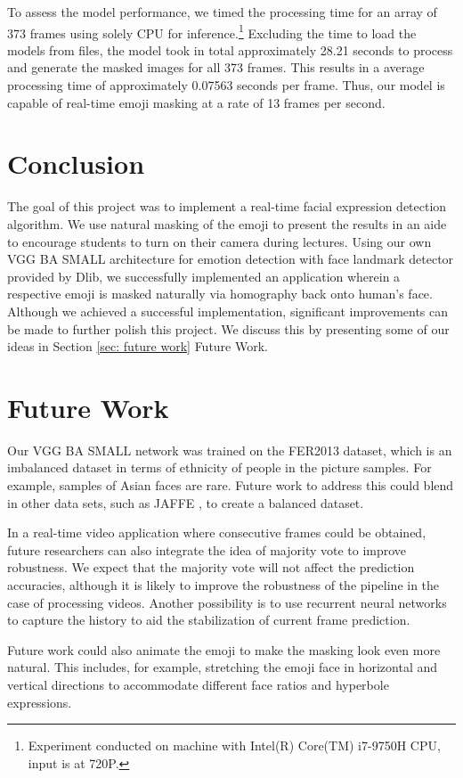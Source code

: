 \documentclass{article}
\begin{document}
To assess the model performance, we timed the processing time for an array of 373 frames using solely CPU for inference.\footnote{Experiment conducted on machine with Intel(R) Core(TM) i7-9750H CPU, input is at 720P.} Excluding the time to load the models from files, the model took in total approximately 28.21 seconds to process and generate the masked images for all 373 frames. This results in a average processing time of approximately 0.07563 seconds per frame. Thus, our model is capable of real-time emoji masking at a rate of 13 frames per second. 
\section{Conclusion}
The goal of this project was to implement a real-time facial expression detection algorithm. We use natural masking of the emoji to present the results in an aide to encourage students to turn on their camera during lectures. Using our own VGG BA SMALL architecture for emotion detection with face landmark detector provided by Dlib, we successfully implemented an application wherein a respective emoji is masked naturally via homography back onto human's face. Although we achieved a successful implementation, significant improvements can be made to further polish this project. We discuss this by presenting some of our ideas in Section \ref{sec: future work} Future Work. 

\section{Future Work\label{sec: future work}}
Our VGG BA SMALL network was trained on the FER2013 dataset, which is an imbalanced dataset in terms of ethnicity of people in the picture samples. For example, samples of Asian faces are rare. Future work to address this could blend in other data sets, such as JAFFE \cite{jaffe}, to create a balanced dataset. 

In a real-time video application where consecutive frames could be obtained, future researchers can also integrate the idea of majority vote to improve robustness. We expect that the majority vote will not affect the prediction accuracies, although it is likely to improve the robustness of the pipeline in the case of processing videos. Another possibility is to use recurrent neural networks to capture the history to aid the stabilization of current frame prediction. 

Future work could also animate the emoji to make the masking look even more natural. This includes, for example, stretching the emoji face in horizontal and vertical directions to accommodate different face ratios and hyperbole expressions.
\end{document}
